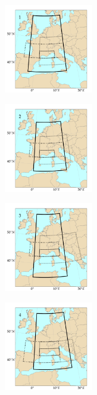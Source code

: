 \documentclass{ametsoc}
\begin{document}
\begin{figure}[htb]
	\centering
	\begin{subfigure}{.5\columnwidth}
		\centering
		\includegraphics[width=3.9cm]{figures/spatial_win_z4/Spatial_windows_1.png}
	\end{subfigure}%
	\begin{subfigure}{.5\columnwidth}
		\centering
		\includegraphics[width=3.9cm]{figures/spatial_win_z4/Spatial_windows_2.png}
	\end{subfigure}
	\begin{subfigure}{.5\columnwidth}
		\centering
		\includegraphics[width=3.9cm]{figures/spatial_win_z4/Spatial_windows_3.png}
	\end{subfigure}%
	\begin{subfigure}{.5\columnwidth}
		\centering
		\includegraphics[width=3.9cm]{figures/spatial_win_z4/Spatial_windows_4.png}
	\end{subfigure}

\end{figure}
\end{document}
